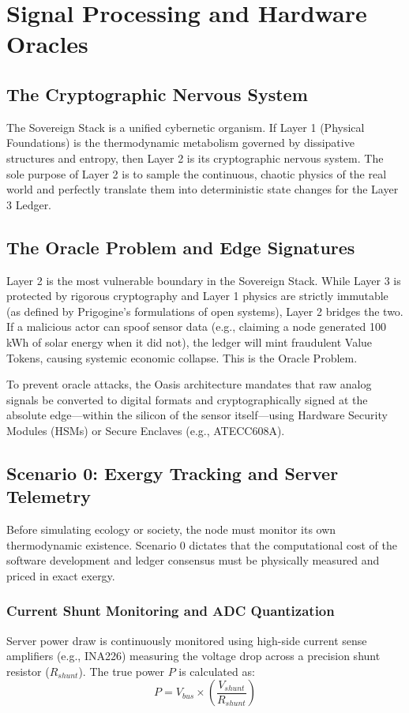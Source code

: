 \chapter{Signal Processing and Hardware Oracles}

\section{The Cryptographic Nervous System}
The Sovereign Stack is a unified cybernetic organism. If Layer 1 (Physical Foundations) is the thermodynamic metabolism governed by dissipative structures and entropy, then Layer 2 is its cryptographic nervous system. The sole purpose of Layer 2 is to sample the continuous, chaotic physics of the real world and perfectly translate them into deterministic state changes for the Layer 3 Ledger. 

\section{The Oracle Problem and Edge Signatures}
Layer 2 is the most vulnerable boundary in the Sovereign Stack. While Layer 3 is protected by rigorous cryptography and Layer 1 physics are strictly immutable (as defined by Prigogine's formulations of open systems), Layer 2 bridges the two. If a malicious actor can spoof sensor data (e.g., claiming a node generated 100 kWh of solar energy when it did not), the ledger will mint fraudulent Value Tokens, causing systemic economic collapse. This is the Oracle Problem.

To prevent oracle attacks, the Oasis architecture mandates that raw analog signals be converted to digital formats and cryptographically signed at the absolute edge—within the silicon of the sensor itself—using Hardware Security Modules (HSMs) or Secure Enclaves (e.g., ATECC608A).

\section{Scenario 0: Exergy Tracking and Server Telemetry}
Before simulating ecology or society, the node must monitor its own thermodynamic existence. Scenario 0 dictates that the computational cost of the software development and ledger consensus must be physically measured and priced in exact exergy.

\subsection{Current Shunt Monitoring and ADC Quantization}
Server power draw is continuously monitored using high-side current sense amplifiers (e.g., INA226) measuring the voltage drop across a precision shunt resistor ($R_{shunt}$). The true power $P$ is calculated as:
\begin{equation}
P = V_{bus} \times \left( \frac{V_{shunt}}{R_{shunt}} \right)
\end{equation}

